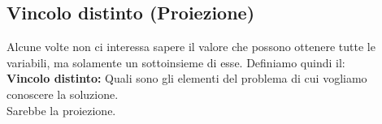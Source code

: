 \subsection{Vincolo distinto (Proiezione)}
Alcune volte non ci interessa sapere il valore che possono ottenere tutte le variabili, ma solamente un sottoinsieme di esse. Definiamo quindi il: 
\\
\textbf{Vincolo distinto:} Quali sono gli elementi del problema di cui vogliamo conoscere la soluzione.
\\Sarebbe la proiezione.
